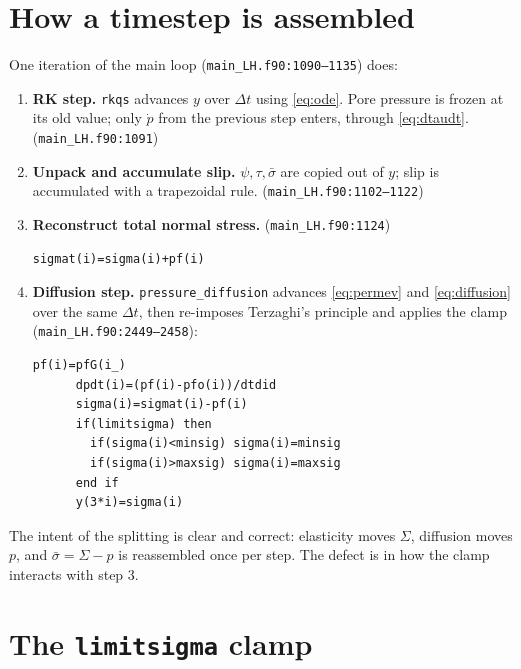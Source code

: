 \documentclass[11pt]{article}
\newcommand{\code}[1]{\texttt{#1}}
\newcommand{\sigeff}{\bar{\sigma}}
\newcommand{\sigtot}{\Sigma}
\begin{document}
\section{How a timestep is assembled}
\label{sec:step}

One iteration of the main loop (\code{main\_LH.f90:1090--1135}) does:

\begin{enumerate}
\item \textbf{RK step.} \code{rkqs} advances $y$ over $\Delta t$ using
      \eqref{eq:ode}. Pore pressure is frozen at its old value; only $\dot p$
      from the previous step enters, through \eqref{eq:dtaudt}.
      (\code{main\_LH.f90:1091})

\item \textbf{Unpack and accumulate slip.} $\psi,\tau,\sigeff$ are copied out
      of $y$; slip is accumulated with a trapezoidal rule.
      (\code{main\_LH.f90:1102--1122})

\item \textbf{Reconstruct total normal stress.} (\code{main\_LH.f90:1124})
\begin{lstlisting}[style=f90]
      sigmat(i)=sigma(i)+pf(i)
\end{lstlisting}

\item \textbf{Diffusion step.} \code{pressure\_diffusion} advances
      \eqref{eq:permev} and \eqref{eq:diffusion} over the same $\Delta t$,
      then re-imposes Terzaghi's principle and applies the clamp
      (\code{main\_LH.f90:2449--2458}):
\begin{lstlisting}[style=f90]
      pf(i)=pfG(i_)
      dpdt(i)=(pf(i)-pfo(i))/dtdid
      sigma(i)=sigmat(i)-pf(i)
      if(limitsigma) then
        if(sigma(i)<minsig) sigma(i)=minsig
        if(sigma(i)>maxsig) sigma(i)=maxsig
      end if
      y(3*i)=sigma(i)
\end{lstlisting}
\end{enumerate}

The intent of the splitting is clear and correct: elasticity moves
$\sigtot$, diffusion moves $p$, and $\sigeff = \sigtot - p$ is reassembled
once per step. The defect is in how the clamp interacts with step 3.

\section{The \code{limitsigma} clamp}
\end{document}
